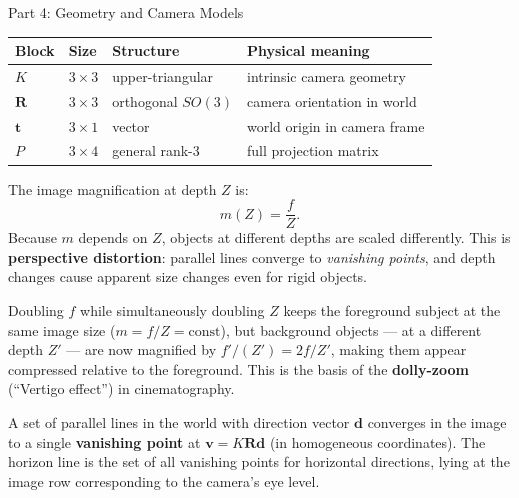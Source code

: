 \documentclass[letterpaper]{article}
\begin{document}
\begin{notes}{Part 4: Geometry and Camera Models}

\begin{center}
\begin{tabular}{@{}llll@{}}
  \toprule
  Block & Size & Structure & Physical meaning \\
  \midrule
  $K$           & $3\times 3$ & upper-triangular    & intrinsic camera geometry \\
  $\mathbf{R}$  & $3\times 3$ & orthogonal $SO(3)$  & camera orientation in world \\
  $\mathbf{t}$  & $3\times 1$ & vector              & world origin in camera frame \\
  $P$           & $3\times 4$ & general rank-3      & full projection matrix \\
  \bottomrule
\end{tabular}
\end{center}



The image magnification at depth $Z$ is:
\begin{equation}
  m(Z) = \frac{f}{Z}.
\end{equation}
Because $m$ depends on $Z$, objects at different depths are scaled
differently.  This is \textbf{perspective distortion}: parallel lines
converge to \emph{vanishing points}, and depth changes cause apparent
size changes even for rigid objects.


Doubling $f$ while simultaneously doubling $Z$ keeps the foreground
subject at the same image size ($m = f/Z = \text{const}$), but
background objects --- at a different depth $Z'$ --- are now magnified by
$f'/(Z') = 2f/Z'$, making them appear compressed relative to the
foreground.  This is the basis of the \textbf{dolly-zoom} (``Vertigo
effect'') in cinematography.


A set of parallel lines in the world with direction vector $\mathbf{d}$
converges in the image to a single \textbf{vanishing point} at
$\mathbf{v} = K\mathbf{R}\mathbf{d}$ (in homogeneous coordinates).
The horizon line is the set of all vanishing points for horizontal
directions, lying at the image row corresponding to the camera's eye level.



\end{notes}
\end{document}
